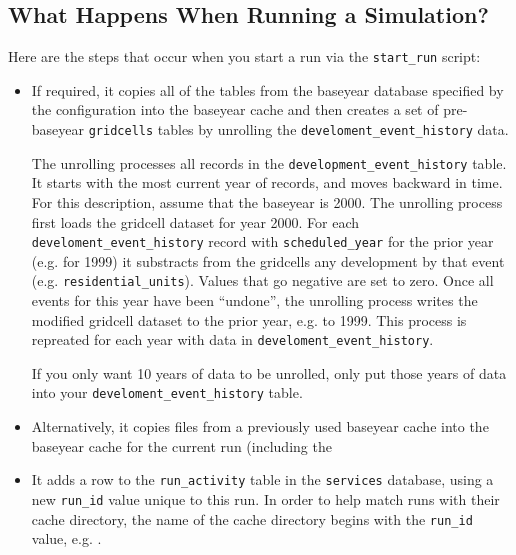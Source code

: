 \subsection{What Happens When Running a Simulation?}
\label{sec:run-manager-tasks}
Here are the steps that occur when you start a run via the \verb|start_run|
script:

\begin{itemize}
  
\item {} If 
required, it copies all of the tables from the baseyear database specified by 
the configuration into the baseyear cache and then creates a
set of pre-baseyear \verb|gridcells| tables by unrolling the
\verb|develoment_event_history| data.

The unrolling processes all records in the \verb|development_event_history| 
table.  It starts with the most current year of records, and moves backward in 
time.  For this description, assume that the baseyear is 2000.  The unrolling 
process first loads the gridcell dataset for year 2000.  For each 
\verb|develoment_event_history| record with \verb|scheduled_year| for the prior 
year (e.g. for 1999) it substracts from the gridcells any development by that 
event (e.g. \verb|residential_units|).  Values that go negative are set to 
zero.  Once all events for this year have been ``undone'', the unrolling 
process writes the modified gridcell dataset to the prior year, e.g. to 1999. 
This process is repreated for each year with data in 
\verb|develoment_event_history|.

If you only want 10 years of data to be unrolled, only put those years of data
into your \verb|develoment_event_history| table.

\item Alternatively, it copies files from a previously used baseyear cache into
the baseyear cache for the current run (including the

\item It adds a row to the \verb|run_activity| table in the \verb|services|
database, using a new \verb|run_id| value unique to this run. In order to help
match runs with their cache directory, the name of the cache directory begins
with the \verb|run_id| value, e.g. .


\end{itemize}
